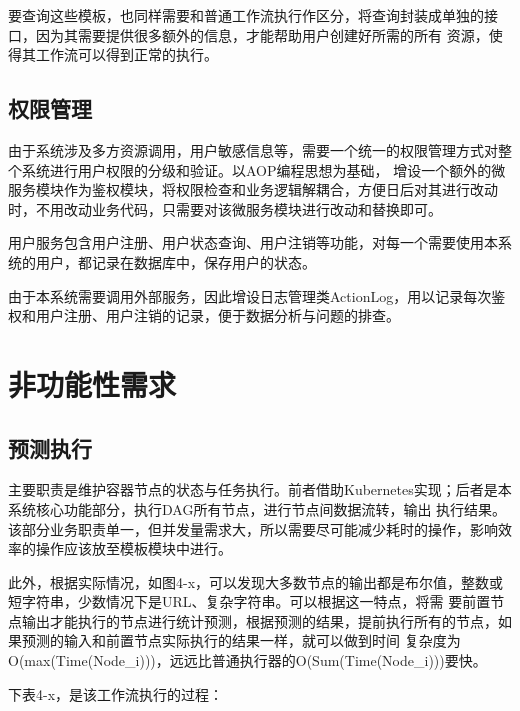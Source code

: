 要查询这些模板，也同样需要和普通工作流执行作区分，将查询封装成单独的接口，因为其需要提供很多额外的信息，才能帮助用户创建好所需的所有
资源，使得其工作流可以得到正常的执行。

\subsection{权限管理}
由于系统涉及多方资源调用，用户敏感信息等，需要一个统一的权限管理方式对整个系统进行用户权限的分级和验证。以AOP编程思想为基础，
增设一个额外的微服务模块作为鉴权模块，将权限检查和业务逻辑解耦合，方便日后对其进行改动时，不用改动业务代码，只需要对该微服务模块进行改动和替换即可。

用户服务包含用户注册、用户状态查询、用户注销等功能，对每一个需要使用本系统的用户，都记录在数据库中，保存用户的状态。

由于本系统需要调用外部服务，因此增设日志管理类ActionLog，用以记录每次鉴权和用户注册、用户注销的记录，便于数据分析与问题的排查。


\section{非功能性需求}

\subsection{预测执行}

主要职责是维护容器节点的状态与任务执行。前者借助Kubernetes实现；后者是本系统核心功能部分，执行DAG所有节点，进行节点间数据流转，输出
执行结果。该部分业务职责单一，但并发量需求大，所以需要尽可能减少耗时的操作，影响效率的操作应该放至模板模块中进行。




此外，根据实际情况，如图4-x，可以发现大多数节点的输出都是布尔值，整数或短字符串，少数情况下是URL、复杂字符串。可以根据这一特点，将需
要前置节点输出才能执行的节点进行统计预测，根据预测的结果，提前执行所有的节点，如果预测的输入和前置节点实际执行的结果一样，就可以做到时间
复杂度为O(max(Time(Node\_i)))，远远比普通执行器的O(Sum(Time(Node\_i)))要快。


下表4-x，是该工作流执行的过程：

